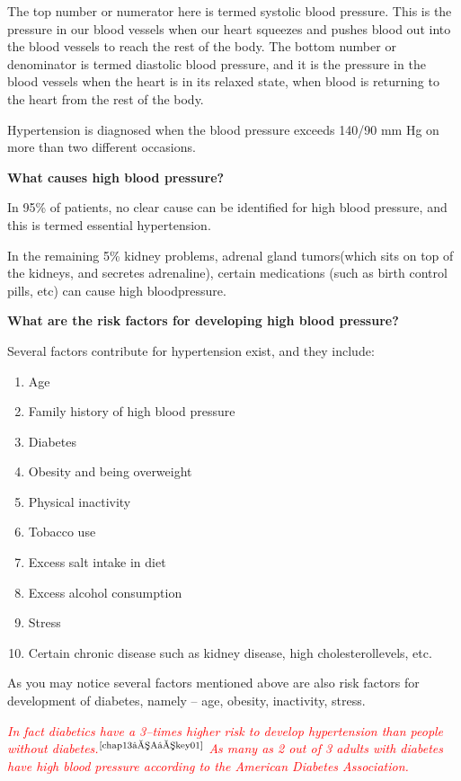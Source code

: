 The top number or numerator here is termed systolic blood pre\-ssure. This is the pressure in our blood vessels when our heart squeezes and pushes blood out into the blood vessels to reach the rest of the body. The bottom number or denominator is termed diastolic blood pre\-ssure, and it is the pressure in the blood vessels when the heart is in its relaxed state, when blood is returning to the heart from the rest of the body.

Hypertension is diagnosed when the blood pressure exceeds 140/90 mm Hg on more than two different occasions.

\vskip 10pt
\noindent\textbf{What causes high blood pressure?}

In 95\% of patients, no clear cause can be identified for high blood pressure, and this is termed essential hypertension.

In the remaining 5\% kidney problems, adrenal gland tumors\break (which sits on top of the kidneys, and secretes adrenaline), certain medications (such as birth control pills, etc) can cause high blood\break pressure.

\vskip 10pt
\noindent\textbf{What are the risk factors for developing high blood pressure?}

\noindent Several factors contribute for hypertension exist, and they include:
\begin{enumerate}[•]
\itemsep=0pt
\item Age
\item Family history of high blood pressure
\item Diabetes
\item Obesity and being overweight
\item Physical inactivity
\item Tobacco use
\item Excess salt intake in diet
\item Excess alcohol consumption
\item Stress
\item Certain chronic disease such as kidney disease, high cholesterol\break levels, etc.
\end{enumerate}

As you may notice several factors mentioned above are also risk factors for development of diabetes, namely – age, obesity, inactivity, stress.

\textcolor{red}{\textit{In fact diabetics have a 3–times higher risk to develop hypertension than people without diabetes.}}$^{\text{\cite{chap13–A–key01}}}$ \textcolor{red}{\textit{As many as 2 out of 3 adults with diabetes have high blood pressure according to the American Diabetes Association.}}

